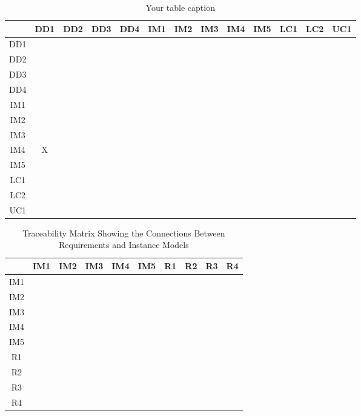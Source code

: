 \documentclass[12pt]{article}
\begin{document}
\begin{table}[htbp]
\centering
\begin{tabular}{|c|c|c|c|c|c|c|c|c|c|c|c|c|}
\hline
 & DD1 & DD2& DD3 & DD4 & IM1 & IM2 & IM3& IM4 & IM5 & LC1& LC2 & UC1\\
\hline
DD1 &  &  &  &  &  &  &  &  &  &  &  &  \\ \hline
DD2 &  &  &  &  &  &  &  &  &  &  &  &  \\ \hline
DD3 &  &  &  &  &  &  &  &  &  &  &  &  \\ \hline
DD4 &  &  &  &  &  &  &  &  &  &  &  &  \\ \hline
IM1 &  &  &  &  &  &  &  &  &  &  &  &  \\ \hline
IM2 &  &  &  &  &  &  &  &  &  &  &  &  \\ \hline
IM3 &  &  &  &  &  &  &  &  &  &  &  &  \\ \hline
IM4 & X &  &  &  &  &  &  &  &  &  &  &   \\ \hline
IM5 &  &  &  &  &  &  &  &  &  &  &  &   \\ \hline
LC1 &  &  &  &  &  &  &  &  &  &  &  &  \\ \hline
LC2 &  &  &  &  &  &  &  &  &  &  &  &  \\ \hline
UC1&  &  &  &  &  &  &  &  &  &  &  &  \\ \hline
\end{tabular}
\caption{Your table caption}
\label{tab:your_table}
\end{table}
\newpage

\begin{table}[htbp]
\centering
\begin{tabular}{|c|c|c|c|c|c|c|c|c|}
\hline
 & IM1 & IM2 & IM3& IM4 & IM5 & R1 & R2 &R3 &R4 \\ \hline
IM1 &  &  &  &  &  &  &  &  \\ \hline
IM2 &  &  &  &  &  &  &  &  \\ \hline
IM3 &  &  &  &  &  &  &  &  \\ \hline
IM4 &  &  &  &  &  &  &  &  \\ \hline
IM5 &  &  &  &  &  &  &  &  \\ \hline
R1 &  &  &  &  &  &  &  &  \\ \hline
R2 &  &  &  &  &  &  &  &  \\ \hline
R3 &  &  &  &  &  &  &  &  \\ \hline
R4 &  &  &  &  &  &  &  &  \\ \hline
\end{tabular}
\caption{Traceability Matrix Showing the Connections Between Requirements and Instance Models}
\label{Table:R_trace}
\end{table}
\newpage
\end{document}
